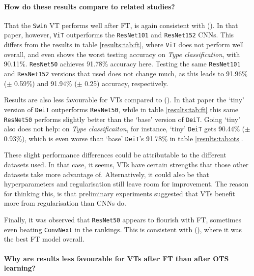 \paragraph{How do these results compare to related studies?}
That the \texttt{Swin} VT performs well after FT, is again consistent with \citeauthor{zhou2021convnets} (\citeyear{zhou2021convnets}). In that paper, however, \texttt{ViT} outperforms the \texttt{ResNet101} and \texttt{ResNet152} CNNs. This differs from the results in table \ref{results:tab:ft}, where \texttt{ViT} does not perform well overall, and even shows the worst testing accuracy on \textit{Type classification}, with 90.11\%. \texttt{ResNet50} achieves 91.78\% accuracy here. Testing the same \texttt{ResNet101} and \texttt{ResNet152} versions that \citeauthor{zhou2021convnets} used does not change much, as this leads to 91.96\% ($\pm$ 0.59\%) and 91.94\% ($\pm$ 0.25) accuracy, respectively.

Results are also less favourable for VTs compared to \citeauthor{matsoukas2021time} (\citeyear{matsoukas2021time}). In that paper the `tiny' version of \texttt{DeiT} outperforms \texttt{ResNet50}, while in table \ref{results:tab:ft} this same \texttt{ResNet50} performs slightly better than the `base' version of \texttt{DeiT}. Going `tiny' also does not help: on \textit{Type classificaiton}, for instance, `tiny' \texttt{DeiT} gets 90.44\% ($\pm$ 0.93\%), which is even worse than `base' \texttt{DeiT}'s 91.78\% in table \ref{results:tab:ots}.

These slight performance differences could be attributable to the different datasets used. In that case, it seems, VTs have certain strengths that those other datasets take more advantage of. Alternatively, it could also be that hyperparameters and regularisation still leave room for improvement. The reason for thinking this, is that preliminary experiments suggested that VTs benefit more from regularisation than CNNs do.

Finally, it was observed that \texttt{ResNet50} appears to flourish with FT, sometimes even beating \texttt{Conv\-Next} in the rankings. This is consistent with \citeauthor{sabatelli2018deep} (\citeyear{sabatelli2018deep}), where it was the best FT model overall.

\paragraph{Why are results less favourable for VTs after FT than after OTS learning?}

